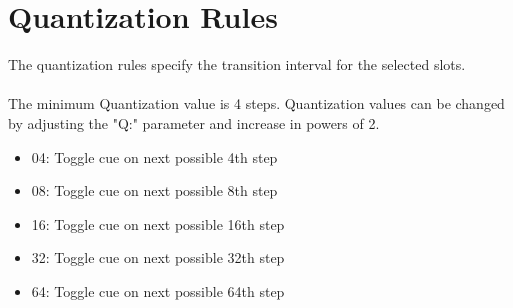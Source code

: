 \section{Quantization Rules}
The quantization rules specify the transition interval for the selected slots.\\
\\
The minimum Quantization value is 4 steps. Quantization values can be changed by adjusting the "Q:" parameter and increase in powers of 2.\\
\begin{itemize}
\item 04: Toggle cue on next possible 4th step
\item 08: Toggle cue on next possible 8th step 
\item 16: Toggle cue on next possible 16th step 
\item 32: Toggle cue on next possible 32th step 
\item 64: Toggle cue on next possible 64th step
\end{itemize}